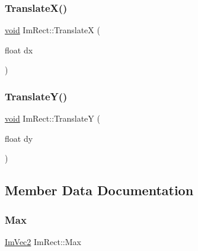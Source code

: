 \mbox{\label{structImRect_a20c399583fc60a1f73715b3c6468a89d}} 
\subsubsection{\texorpdfstring{Translate\+X()}{TranslateX()}}
{\footnotesize\ttfamily \hyperlink{imgui__impl__opengl3__loader_8h_ac668e7cffd9e2e9cfee428b9b2f34fa7}{void} Im\+Rect\+::\+TranslateX (\begin{DoxyParamCaption}\item[{float}]{dx }\end{DoxyParamCaption})\hspace{0.3cm}{\ttfamily [inline]}}

\mbox{\label{structImRect_abb777eaa8fd13ad6b7d6dab56d29fe52}} 
\subsubsection{\texorpdfstring{Translate\+Y()}{TranslateY()}}
{\footnotesize\ttfamily \hyperlink{imgui__impl__opengl3__loader_8h_ac668e7cffd9e2e9cfee428b9b2f34fa7}{void} Im\+Rect\+::\+TranslateY (\begin{DoxyParamCaption}\item[{float}]{dy }\end{DoxyParamCaption})\hspace{0.3cm}{\ttfamily [inline]}}



\subsection{Member Data Documentation}
\mbox{\label{structImRect_aad58c13340d320b350a72a037e3f7628}} 
\subsubsection{\texorpdfstring{Max}{Max}}
{\footnotesize\ttfamily \hyperlink{structImVec2}{Im\+Vec2} Im\+Rect\+::\+Max}

\mbox{\label{structImRect_af8f3fbf7ec983e03548b88e14ba68aa8}} 
